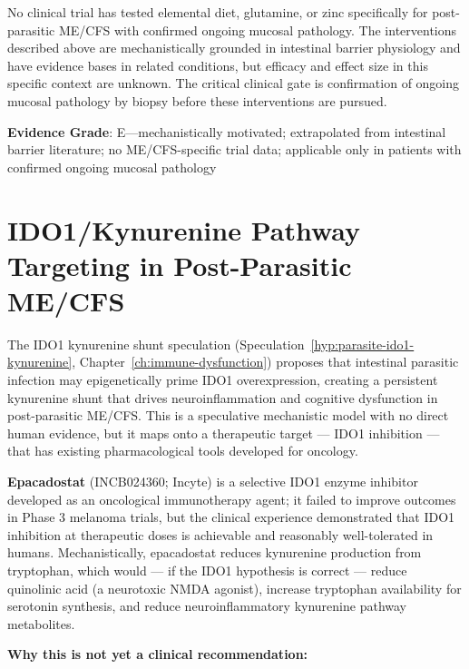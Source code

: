\begin{limitation}
No clinical trial has tested elemental diet, glutamine, or zinc specifically for post-parasitic ME/CFS with confirmed ongoing mucosal pathology. The interventions described above are mechanistically grounded in intestinal barrier physiology and have evidence bases in related conditions, but efficacy and effect size in this specific context are unknown. The critical clinical gate is confirmation of ongoing mucosal pathology by biopsy before these interventions are pursued.
\end{limitation}

\textbf{Evidence Grade}: E---mechanistically motivated; extrapolated from intestinal barrier literature; no ME/CFS-specific trial data; applicable only in patients with confirmed ongoing mucosal pathology

\section{IDO1/Kynurenine Pathway Targeting in Post-Parasitic ME/CFS}
\label{sec:post-parasitic-ido1}

The IDO1 kynurenine shunt speculation (Speculation~\ref{hyp:parasite-ido1-kynurenine}, Chapter~\ref{ch:immune-dysfunction}) proposes that intestinal parasitic infection may epigenetically prime IDO1 overexpression, creating a persistent kynurenine shunt that drives neuroinflammation and cognitive dysfunction in post-parasitic ME/CFS. This is a speculative mechanistic model with no direct human evidence, but it maps onto a therapeutic target --- IDO1 inhibition --- that has existing pharmacological tools developed for oncology.

\textbf{Epacadostat} (INCB024360; Incyte) is a selective IDO1 enzyme inhibitor developed as an oncological immunotherapy agent; it failed to improve outcomes in Phase 3 melanoma trials, but the clinical experience demonstrated that IDO1 inhibition at therapeutic doses is achievable and reasonably well-tolerated in humans. Mechanistically, epacadostat reduces kynurenine production from tryptophan, which would --- if the IDO1 hypothesis is correct --- reduce quinolinic acid (a neurotoxic NMDA agonist), increase tryptophan availability for serotonin synthesis, and reduce neuroinflammatory kynurenine pathway metabolites.

\textbf{Why this is not yet a clinical recommendation:}

